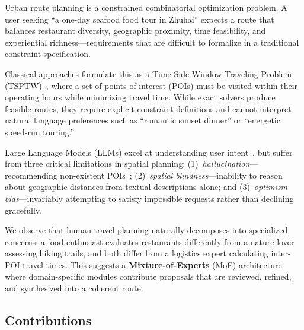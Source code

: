 \documentclass[11pt]{article}
\begin{document}
Urban route planning is a constrained combinatorial optimization problem. A user seeking ``a one-day seafood food tour in Zhuhai'' expects a route that balances restaurant diversity, geographic proximity, time feasibility, and experiential richness---requirements that are difficult to formalize in a traditional constraint specification.

Classical approaches formulate this as a Time-Side Window Traveling Problem (TSPTW)~\cite{solomon1987algorithms}, where a set of points of interest (POIs) must be visited within their operating hours while minimizing travel time. While exact solvers produce feasible routes, they require explicit constraint definitions and cannot interpret natural language preferences such as ``romantic sunset dinner'' or ``energetic speed-run touring.''

Large Language Models (LLMs) excel at understanding user intent~\cite{wei2022chain}, but suffer from three critical limitations in spatial planning: (1)~\textit{hallucination}---recommending non-existent POIs~\cite{ji2023survey}; (2)~\textit{spatial blindness}---inability to reason about geographic distances from textual descriptions alone; and (3)~\textit{optimism bias}---invariably attempting to satisfy impossible requests rather than declining gracefully.

We observe that human travel planning naturally decomposes into specialized concerns: a food enthusiast evaluates restaurants differently from a nature lover assessing hiking trails, and both differ from a logistics expert calculating inter-POI travel times. This suggests a \textbf{Mixture-of-Experts} (MoE) architecture~\cite{shazeer2017outrageously} where domain-specific modules contribute proposals that are reviewed, refined, and synthesized into a coherent route.

\subsection{Contributions}
\end{document}
